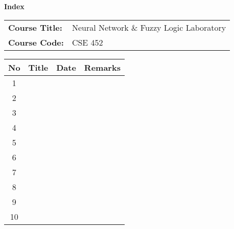 \documentclass[a4paper,12pt]{article}
\begin{document}
\pagestyle{empty}

\vspace{-2.5\baselineskip}
\begin{center}
    {\LARGE \textbf{Index}}\\[1cm]
\end{center}

\noindent
\begin{minipage}[t]{0.5\textwidth}
    \begin{tabular}{@{}ll}
        \textbf{Course Title:} & Neural Network \& Fuzzy Logic Laboratory \\
        \textbf{Course Code:} & CSE 452 \\
    \end{tabular}
\end{minipage}



\renewcommand{\arraystretch}{2.89} %
\begin{longtable}{|c|>{\centering\arraybackslash}p{7.5cm}|>{\centering\arraybackslash}p{3.5cm}|>{\centering\arraybackslash}p{3.5cm}|}
\hline
\textbf{No} & \textbf{Title} & \textbf{Date} & \textbf{Remarks} \\
\hline
1 & & & \\
\hline
2 & & & \\
\hline
3 & & & \\
\hline
4 & & & \\
\hline
5 & & & \\
\hline
6 & & & \\
\hline
7 & & & \\
\hline
8 & & & \\
\hline
9 & & & \\
\hline
10 & & & \\
\hline
\end{longtable}
\end{document}
